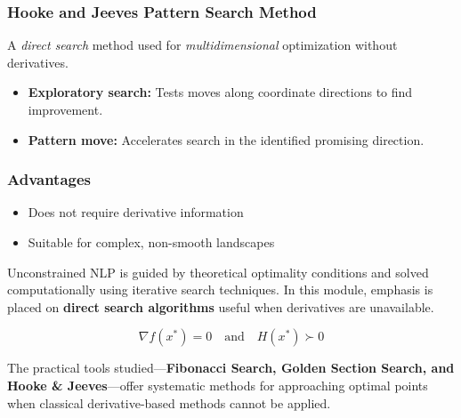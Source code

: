 \documentclass[
  letterpaper,
  DIV=11,
  numbers=noendperiod]{scrreprt}
\providecommand{\tightlist}{%
  \setlength{\itemsep}{0pt}\setlength{\parskip}{0pt}}
\begin{document}
\subsubsection{Hooke and Jeeves Pattern Search
Method}\label{hooke-and-jeeves-pattern-search-method}

A \emph{direct search} method used for \emph{multidimensional}
optimization without derivatives.

\begin{tcolorbox}[enhanced jigsaw, leftrule=.75mm, rightrule=.15mm, colback=white, colbacktitle=quarto-callout-note-color!10!white, arc=.35mm, opacityback=0, toptitle=1mm, bottomrule=.15mm, bottomtitle=1mm, titlerule=0mm, title=\textcolor{quarto-callout-note-color}{\faInfo}\hspace{0.5em}{Key Components}, toprule=.15mm, left=2mm, coltitle=black, breakable, colframe=quarto-callout-note-color-frame, opacitybacktitle=0.6]

\begin{itemize}
\tightlist
\item
  \textbf{Exploratory search:} Tests moves along coordinate directions
  to find improvement.
\item
  \textbf{Pattern move:} Accelerates search in the identified promising
  direction.
\end{itemize}

\end{tcolorbox}

\subsubsection{Advantages}\label{advantages}

\begin{itemize}
\tightlist
\item
  Does not require derivative information
\item
  Suitable for complex, non-smooth landscapes
\end{itemize}

Unconstrained NLP is guided by theoretical optimality conditions and
solved computationally using iterative search techniques. In this
module, emphasis is placed on \textbf{direct search algorithms} useful
when derivatives are unavailable.

\[
\nabla f(x^{*}) = 0 \quad \text{and} \quad H(x^{*}) \succ 0
\]

The practical tools studied---\textbf{Fibonacci Search, Golden Section
Search, and Hooke \& Jeeves}---offer systematic methods for approaching
optimal points when classical derivative-based methods cannot be
applied.
\end{document}
